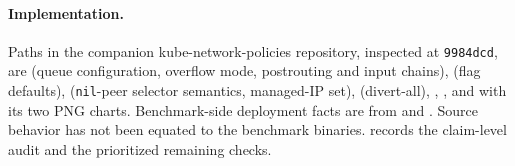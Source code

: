 \paragraph{Implementation.}
Paths in the companion kube-network-policies repository, inspected at
\texttt{9984dcd}, are  (queue
configuration, overflow mode, postrouting and input chains),
 (flag defaults),
 (\texttt{nil}-peer selector
semantics, managed-IP set),
 (divert-all),
, ,
and  with its two PNG charts. Benchmark-side
deployment facts are from 
and . Source behavior has not been equated
to the benchmark binaries.  records the
claim-level audit and  the prioritized
remaining checks.
